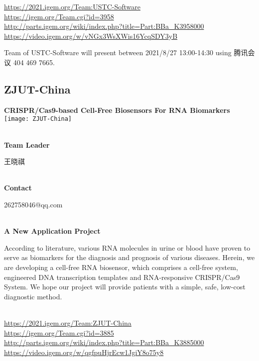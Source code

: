 \url{https://2021.igem.org/Team:USTC-Software }\\
\url{https://igem.org/Team.cgi?id=3958 }\\
\url{http://parts.igem.org/wiki/index.php?title=Part:BBa_K3958000 }\\
\url{https://video.igem.org/w/vNGx3WsXWis16YcqSDY3yB }\\

\vfill{}









Team of USTC-Software will present between 2021/8/27 13:00-14:30        using 腾讯会议 404 469 7665.
\newpage


\subsection{\textcolor{Blu}{ ZJUT-China } }
\vspace{5mm}
\begin{center}
\large{
  \textbf{ CRISPR/Cas9-based Cell-Free Biosensors For RNA Biomarkers }\\

  \texttt{[image: ZJUT-China]}
}
\end{center}
\textbf{\\Team Leader}

  王晓祺


\textbf{\\Contact}

  262758046@qq.com


\textbf{\\A New Application Project\\}\begin{spacing}{1.5}

According to literature, various RNA molecules in urine or blood have proven to serve as biomarkers for the diagnosis and prognosis of various diseases. Herein, we are developing a cell-free RNA biosensor, which comprises a cell-free system, engineered DNA transcription templates and RNA-responsive CRISPR/Cas9 System. We hope our project will provide patients with a simple, safe, low-cost diagnostic method.\end{spacing}
\\

\url{https://2021.igem.org/Team:ZJUT-China }\\
\url{https://igem.org/Team.cgi?id=3885 }\\
\url{http://parts.igem.org/wiki/index.php?title=Part:BBa_K3885000 }\\
\url{https://video.igem.org/w/qgfpuHjrEcw1JgiY8o75y8 }\\

